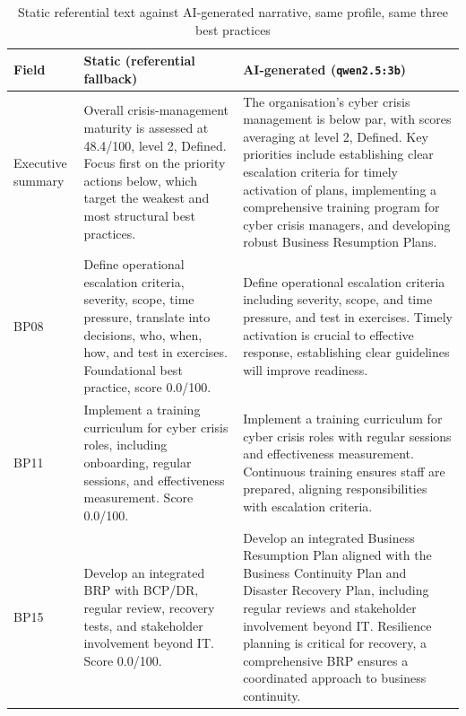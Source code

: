 \begin{table}[htbp]
  \centering
  \small
  \begin{tabular}{@{}p{1.6cm}p{6.85cm}p{6.85cm}@{}}
    \toprule
    Field & Static (referential fallback) & AI-generated (\texttt{qwen2.5:3b}) \\
    \midrule
    Executive summary &
    Overall crisis-management maturity is assessed at 48.4/100, level 2,
    Defined. Focus first on the priority actions below, which target the
    weakest and most structural best practices. &
    The organisation's cyber crisis management is below par, with scores
    averaging at level 2, Defined. Key priorities include establishing
    clear escalation criteria for timely activation of plans, implementing
    a comprehensive training program for cyber crisis managers, and
    developing robust Business Resumption Plans. \\
    \addlinespace
    BP08 &
    Define operational escalation criteria, severity, scope, time
    pressure, translate into decisions, who, when, how, and test in
    exercises. Foundational best practice, score 0.0/100. &
    Define operational escalation criteria including severity, scope, and
    time pressure, and test in exercises. Timely activation is crucial to
    effective response, establishing clear guidelines will improve
    readiness. \\
    \addlinespace
    BP11 &
    Implement a training curriculum for cyber crisis roles, including
    onboarding, regular sessions, and effectiveness measurement. Score
    0.0/100. &
    Implement a training curriculum for cyber crisis roles with regular
    sessions and effectiveness measurement. Continuous training ensures
    staff are prepared, aligning responsibilities with escalation
    criteria. \\
    \addlinespace
    BP15 &
    Develop an integrated BRP with BCP/DR, regular review, recovery tests,
    and stakeholder involvement beyond IT. Score 0.0/100. &
    Develop an integrated Business Resumption Plan aligned with the
    Business Continuity Plan and Disaster Recovery Plan, including regular
    reviews and stakeholder involvement beyond IT. Resilience planning is
    critical for recovery, a comprehensive BRP ensures a coordinated
    approach to business continuity. \\
    \bottomrule
  \end{tabular}
  \caption{Static referential text against AI-generated narrative, same
  profile, same three best practices}
  \label{tab:validation-recommendation-comparison}
\end{table}
